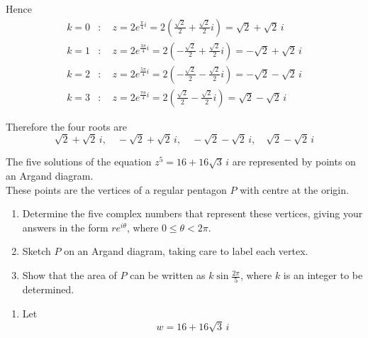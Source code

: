 \documentclass[leqno]{article}
\begin{document}
\begin{enumerate}[
  label=\textbf{\arabic*.},
  leftmargin=*,
  topsep=0pt,
  partopsep=0pt,
  parsep=0pt
]
\begin{djsSolution}
\begin{enumerate}[label=\textbf{(\alph*)}]
  Hence
  \begin{align*}
  k=0&:\quad z=2e^{\frac{\pi}{4}i}
  =2\left(\frac{\sqrt2}{2}+\frac{\sqrt2}{2}i\right)
  =\sqrt2+\sqrt2\,i \\
  k=1&:\quad z=2e^{\frac{3\pi}{4}i}
  =2\left(-\frac{\sqrt2}{2}+\frac{\sqrt2}{2}i\right)
  =-\sqrt2+\sqrt2\,i \\
  k=2&:\quad z=2e^{\frac{5\pi}{4}i}
  =2\left(-\frac{\sqrt2}{2}-\frac{\sqrt2}{2}i\right)
  =-\sqrt2-\sqrt2\,i \\
  k=3&:\quad z=2e^{\frac{7\pi}{4}i}
  =2\left(\frac{\sqrt2}{2}-\frac{\sqrt2}{2}i\right)
  =\sqrt2-\sqrt2\,i
  \end{align*}

  Therefore the four roots are
  \[
  \sqrt2+\sqrt2\,i,\quad -\sqrt2+\sqrt2\,i,\quad -\sqrt2-\sqrt2\,i,\quad \sqrt2-\sqrt2\,i
  \]
\end{enumerate}
\end{djsSolution}


\newpage

\questionitem

The five solutions of the equation $z^5=16+16\sqrt{3}\,i$ are represented by points on an Argand diagram. \\

These points are the vertices of a regular pentagon $P$ with centre at the origin. \\

\begin{enumerate}[label=\textbf{(\alph*)}]
    \item Determine the five complex numbers that represent these vertices, giving your answers in the form $re^{i\theta}$, where $0\leq \theta<2\pi$.  \\

    \item Sketch $P$ on an Argand diagram, taking care to label each vertex. \\

    \item Show that the area of $P$ can be written as $k\sin\frac{2\pi}{5}$, where $k$ is an integer to be determined. 
    
\end{enumerate}

\vspace*{10pt}

\begin{djsSolution}
\begin{enumerate}[label=\textbf{(\alph*)}]
  \item Let
\[
w=16+16\sqrt{3}\,i
\]


\end{enumerate}
\end{djsSolution}
\end{enumerate}
\end{document}
